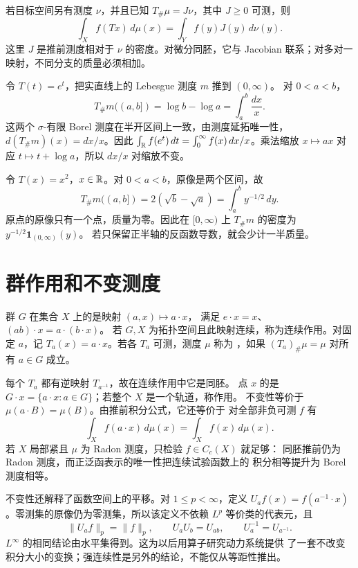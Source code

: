 若目标空间另有测度 $\nu$，并且已知
$T_\#\mu=J\nu$，其中 $J\ge0$ 可测，则
\[
 \int_X f(Tx)\,d\mu(x)=\int_Y f(y)J(y)\,d\nu(y).
\]
这里 $J$ 是推前测度相对于 $\nu$ 的密度。对微分同胚，它与 Jacobian
联系；对多对一映射，不同分支的质量必须相加。

\begin{example}[乘法尺度]
令 $T(t)=e^t$，把实直线上的 Lebesgue 测度 $m$ 推到 $(0,\infty)$。
对 $0<a<b$，
\[
 T_\#m((a,b])=\log b-\log a=\int_a^b\frac{dx}{x}.
\]
这两个 $\sigma$-有限 Borel 测度在半开区间上一致，由测度延拓唯一性，
$d(T_\#m)(x)=dx/x$。因此
$\int_{\mathbb{R}}f(e^t)\,dt=\int_0^\infty f(x)\,dx/x$。乘法缩放
$x\mapsto ax$ 对应 $t\mapsto t+\log a$，所以 $dx/x$ 对缩放不变。
\end{example}

\begin{example}[折叠的两个分支]
令 $T(x)=x^2$，$x\in\mathbb{R}$。对 $0<a<b$，原像是两个区间，故
\[
 T_\#m((a,b])=2(\sqrt b-\sqrt a)=\int_a^b y^{-1/2}\,dy.
\]
原点的原像只有一个点，质量为零。因此在 $[0,\infty)$ 上
$T_\#m$ 的密度为 $y^{-1/2}\mathbf1_{(0,\infty)}(y)$。
若只保留正半轴的反函数导数，就会少计一半质量。
\end{example}

\section{群作用和不变测度}
\label{sec:group-actions-invariant-measures}

\begin{definition}
群 $G$ 在集合 $X$ 上的是映射 $(a,x)\mapsto a\cdot x$，
满足 $e\cdot x=x$、$(ab)\cdot x=a\cdot(b\cdot x)$。
若 $G,X$ 为拓扑空间且此映射连续，称为连续作用。对固定 $a$，记
$T_a(x)=a\cdot x$。若各 $T_a$ 可测，测度 $\mu$ 称为
，如果 $(T_a)_\#\mu=\mu$ 对所有 $a\in G$ 成立。
\end{definition}

每个 $T_a$ 都有逆映射 $T_{a^{-1}}$，故在连续作用中它是同胚。
点 $x$ 的是 $G\cdot x=\{a\cdot x:a\in G\}$；若整个
$X$ 是一个轨道，称作用。
不变性等价于 $\mu(a\cdot B)=\mu(B)$。由推前积分公式，它还等价于
对全部非负可测 $f$ 有
\[
 \int_X f(a\cdot x)\,d\mu(x)=\int_X f(x)\,d\mu(x).
\]
若 $X$ 局部紧且 $\mu$ 为 Radon 测度，只检验 $f\in C_c(X)$ 就足够：
同胚推前仍为 Radon 测度，而正泛函表示的唯一性把连续试验函数上的
积分相等提升为 Borel 测度相等。

不变性还解释了函数空间上的平移。对 $1\le p<\infty$，定义
$U_af(x)=f(a^{-1}\cdot x)$。零测集的原像仍为零测集，所以该定义不依赖
$L^p$ 等价类的代表元，且
\[
 \|U_af\|_p=\|f\|_p,\qquad U_aU_b=U_{ab},\qquad U_a^{-1}=U_{a^{-1}}.
\]
$L^\infty$ 的相同结论由水平集得到。这为以后用算子研究动力系统提供
了一套不改变积分大小的变换；强连续性是另外的结论，不能仅从等距性推出。

